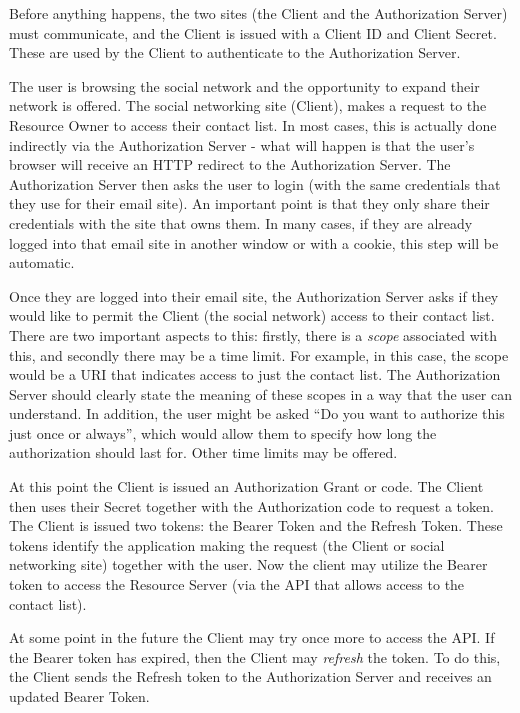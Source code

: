 \documentclass{IEEEtran}
\begin{document}
Before anything happens, the two sites (the Client and the Authorization Server) must 
communicate, and the Client is issued with a Client ID and Client Secret. These are used by 
the Client to authenticate to the Authorization Server.

The user is browsing the social network and the opportunity to expand their network is offered.
The social networking site (Client), makes a request to the Resource Owner to access their contact list. 
In most cases, this is actually done indirectly via the Authorization Server - what will happen is that 
the user's browser will receive an HTTP redirect to the Authorization Server. The Authorization Server then asks the user to 
login (with the same credentials that they use for their email site). An important point is that they only
share their credentials with the site that owns them. In many cases, if they are already logged into that
email site in another window or with a cookie, this step will be automatic.

Once they are logged into their email site, the Authorization Server asks if they would like to 
permit the Client (the social network) access to their contact list. There are two important aspects
to this: firstly, there is a \emph{scope} associated with this, and secondly there may be a time limit. 
For example, in this case, the scope would be a URI that indicates access to just the contact list. The Authorization Server 
should clearly state the meaning of these scopes in a way that the user can understand.
In addition, the user might be asked ``Do you want to authorize this just once or always'', which would allow them
to specify how long the authorization should last for. Other time limits may be offered.

At this point the Client is issued an Authorization Grant or code. The Client then
uses their Secret together with the Authorization code to request a token. The Client is issued two tokens: the Bearer Token and the Refresh Token. These tokens identify
the application making the request (the Client or social networking site) together with the user.
Now the client may utilize the Bearer token to access the Resource Server (via the API that allows access to the 
contact list). 


At some point in the future the Client may try once more to access the API. 
If the Bearer token has expired, then the Client may \emph{refresh} the token. To do this, the 
Client sends the Refresh token to the Authorization Server and receives an updated Bearer Token.
\end{document}
